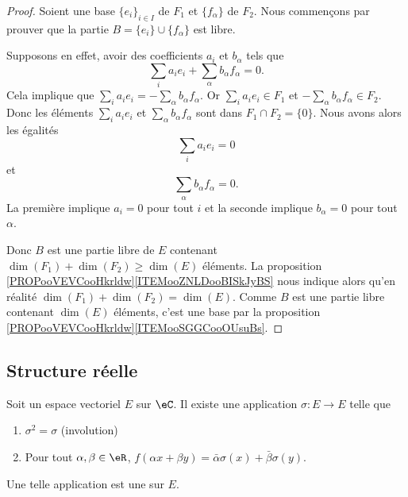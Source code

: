 \begin{proof}
	Soient une base \( \{ e_i \}_{i\in I}\) de \( F_1\) et \( \{ f_{\alpha} \}\) de \( F_2\). Nous commençons par prouver que la partie \( B=\{ e_i \}\cup \{ f_{\alpha} \}\) est libre.

	Supposons en effet, avoir des coefficients \( a_i\) et \( b_{\alpha}\) tels que
	\begin{equation}
		\sum_i a_ie_i+\sum_{\alpha}b_{\alpha}f_{\alpha}=0.
	\end{equation}
	Cela implique que \( \sum_ia_ie_i=-\sum_{\alpha}b_{\alpha}f_{\alpha}\). Or \( \sum_ia_ie_i\in F_1\) et \( -\sum_{\alpha}b_{\alpha}f_{\alpha}\in F_2\). Donc les éléments \( \sum_i a_ie_i\) et \( \sum_{\alpha}b_{\alpha}f_{\alpha}\) sont dans \( F_1\cap F_2=\{ 0 \}\). Nous avons alors les égalités
	\begin{equation}
		\sum_i a_ie_i=0
	\end{equation}
	et
	\begin{equation}
		\sum_{\alpha}b_{\alpha}f_{\alpha}=0.
	\end{equation}
	La première implique \( a_i=0\) pour tout \( i\) et la seconde implique \( b_{\alpha}=0\) pour tout \( \alpha\).

	Donc \( B\) est une partie libre de \( E\) contenant \( \dim(F_1)+\dim(F_2)\geq \dim(E)\) éléments. La proposition \ref{PROPooVEVCooHkrldw}\ref{ITEMooZNLDooBISkJyBS} nous indique alors qu'en réalité \( \dim(F_1)+\dim(F_2)=\dim(E)\). Comme \( B\) est une partie libre contenant \( \dim(E)\) éléments, c'est une base par la proposition \ref{PROPooVEVCooHkrldw}\ref{ITEMooSGGCooOUsuBs}.
\end{proof}

\subsection{Structure réelle}

\begin{propositionDef}         \label{DEFooCIFSooVmcNtE}
	Soit un espace vectoriel \( E\) sur \( \eC\). Il existe une application \( \sigma\colon E\to E\) telle que
	\begin{enumerate}
		\item
		      \( \sigma^2=\sigma\) (involution)
		\item
		      Pour tout \( \alpha,\beta\in \eR\), \( f(\alpha x+\beta y)=\bar \alpha \sigma(x)+\bar \beta \sigma(y)\).
	\end{enumerate}
	Une telle application est une  sur \( E\).
\end{propositionDef}

